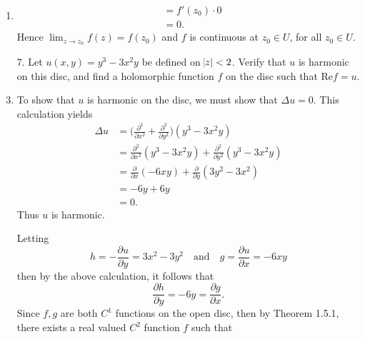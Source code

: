 \documentclass[12pt]{article}
\makeatletter
\theoremstyle{definition}
\theoremstyle{remark}
\renewenvironment{proof}[1][\proofname]{\par
  \pushQED{\qed}%
  \normalfont \topsep6\p@\@plus6\p@\relax
  \list{}{\leftmargin=0mm
          \rightmargin=4mm
          \settowidth{\itemindent}{\itshape#1}%
          \labelwidth=\itemindent
          \parsep=0pt \listparindent=\parindent 
  }
  \item[\hskip\labelsep
        \itshape
    #1\@addpunct{.}]\ignorespaces
}{%
  \popQED\endlist\@endpefalse
}
\let\oldproofname=\proofname
\renewcommand{\proofname}{\bf{\textit{\oldproofname}}}
\makeatother
\begin{document}
\begin{enumerate}[leftmargin=*]
\begin{proof}
\begin{equation*}
\begin{split}
                            &=f'(z_0)\cdot 0 \\
                            &= 0.
                        \end{split}
                    \end{equation*}
                Hence $\lim_{z\rightarrow z_0}f(z)=f(z_0)$ and $f$ is continuous at $z_0\in U$, for all $z_0\in U$.
            \end{proof}
        \item[7.] Let $u(x,y)=y^3-3x^2y$ be defined on $\abs{z}<2$. Verify that $u$ is harmonic on this disc, and find a holomorphic function $f$ on the disc such that Re$f=u$.
            \begin{proof}
                To show that $u$ is harmonic on the disc, we must show that $\Delta u=0$. This calculation yields
                    \begin{equation*}
                        \begin{split}
                            \Delta u&=\bigg(\frac{\partial^2}{\partial x^2}+\frac{\partial^2}{\partial y^2}\bigg)(y^3-3x^2y) \\
                            &=\frac{\partial^2}{\partial x^2}(y^3-3x^2y)+\frac{\partial^2}{\partial y^2}(y^3-3x^2y) \\
                            &=\frac{\partial}{\partial x}(-6xy)+\frac{\partial}{\partial y}(3y^2-3x^2) \\
                            &= -6y+6y \\
                            &= 0.
                        \end{split}
                    \end{equation*}
                Thus $u$ is harmonic.\par\hspace{4mm} Letting 
                    \begin{equation*}
                        h=-\frac{\partial u}{\partial y}=3x^2-3y^2\quad\text{and}\quad g=\frac{\partial u}{\partial x}=-6xy
                    \end{equation*}
                then by the above calculation, it follows that 
                    \begin{equation*}
                        \frac{\partial h}{\partial y}=-6y=\frac{\partial g}{\partial x}.
                    \end{equation*}
                Since $f,g$ are both $C^1$ functions on the open disc, then by Theorem 1.5.1, there exists a real valued $C^2$ function $f$ such that 

\end{proof}
\end{enumerate}
\end{document}

